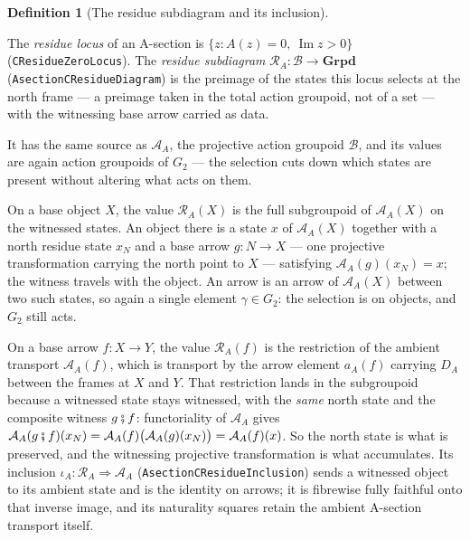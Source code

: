 \documentclass[11pt]{article}
\providecommand{\lean}[1]{}
\providecommand{\uses}[1]{}
\theoremstyle{plain}
\theoremstyle{definition}
\newtheorem{definition}[theorem]{Definition}
\theoremstyle{remark}
\begin{document}
\begin{definition}[The residue subdiagram and its inclusion]\label{def:residue-subdiagram}
\lean{ASection.CResidueZeroLocus, ASection.IsCResidueInput,
ASection.CResidueInputWorld, ASection.AsectionCResidueInputDiagram,
ASection.AsectionCResidueDiagram, ASection.AsectionCResidueInclusion,
ASection.AsectionCResidueInclusionTotal,
ASection.AsectionCResidueInclusionTotal_full,
ASection.AsectionCResidueInclusionTotal_faithful,
ASection.residueTotalCategory, ASection.residueTotalGroupoid}
\uses{def:base, def:A-section, lem:residue-spheres}
The \emph{residue locus} of an A-section is $\{z : A(z)=0,\ \operatorname{Im}z>0\}$
\textup{(}\texttt{CResidueZeroLocus}\textup{)}. The \emph{residue subdiagram}
$\mathcal R_A:\mathcal B\to\mathbf{Grpd}$ \textup{(}\texttt{AsectionCResidueDiagram}\textup{)} is
the preimage of the states this locus selects at the north frame --- a preimage taken in the
total action groupoid, not of a set --- with the witnessing base arrow carried as data.

It has the same source as $\mathcal A_A$, the projective action groupoid
$\mathcal B$, and its values are again action groupoids of $G_2$ --- the
selection cuts down which states are present without altering what acts on
them.

On a base object $X$, the value $\mathcal R_A(X)$ is the full subgroupoid of
$\mathcal A_A(X)$ on the witnessed states. An object there is a state $x$ of
$\mathcal A_A(X)$ together with a north residue state $x_N$ and a base arrow
$g:N\to X$ --- one projective transformation carrying the north point to $X$
--- satisfying $\mathcal A_A(g)(x_N)=x$; the witness travels with the object.
An arrow is an arrow of $\mathcal A_A(X)$ between two such states, so again a
single element $\gamma\in G_2$: the selection is on objects, and $G_2$ still
acts.

On a base arrow $f:X\to Y$, the value $\mathcal R_A(f)$ is the restriction of
the ambient transport $\mathcal A_A(f)$, which is transport by the arrow
element $a_A(f)$ carrying $D_A$ between the frames at $X$ and $Y$. That
restriction lands in the subgroupoid because a witnessed state stays witnessed,
with the \emph{same} north state and the composite witness $g\fatsemi f$:
functoriality of $\mathcal A_A$ gives
$\mathcal A_A(g\fatsemi f)(x_N)=\mathcal A_A(f)\bigl(\mathcal A_A(g)(x_N)\bigr)
 =\mathcal A_A(f)(x)$.
So the north state is what is preserved, and the witnessing projective
transformation is what accumulates.
Its inclusion $\iota_A:\mathcal R_A\Rightarrow\mathcal A_A$
\textup{(}\texttt{AsectionCResidueInclusion}\textup{)} sends a witnessed object
to its ambient state and is the identity on arrows; it is fibrewise fully
faithful onto that inverse image, and its naturality squares retain the ambient
A-section transport itself.


\end{definition}
\end{document}
